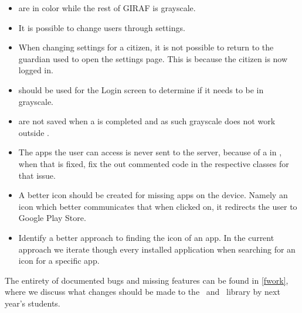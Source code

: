 \begin{itemize}
  \item {} are in color while the rest of GIRAF is grayscale.
  \item It is possible to change users through settings.
  \item When changing settings for a citizen, it is not possible
  to return to the guardian used to open the settings page. This is because 
  the citizen is now logged in.
  \item {} should be used for the Login screen to determine
  if it needs to be in grayscale.
  \item {} are not saved when a  is completed
  and as such grayscale does not work outside .
  \item The apps the user can access is never sent to the server, because of a
   in \rlib, when that is fixed, fix the out
  commented code in the respective classes for that issue.
  \item A better icon should be created for missing apps on the device. Namely
  an icon which better communicates that when clicked on, it redirects the user
  to Google Play Store.
  \item Identify a better approach to finding the icon of an app. In the current
  approach we iterate though every installed application when
  searching for an icon for a specific app.
\end{itemize}

The entirety of documented bugs and missing features can be found in
\autoref{fwork}, where we discuss what changes should be made to the
\lapp\ and \clib\ library by next year's students.


